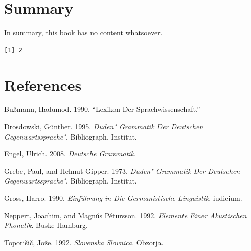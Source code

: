 \documentclass[
  letterpaper,
]{scrbook}
\newlength{\cslhangindent}
\newlength{\cslentryspacingunit} %
\newenvironment{CSLReferences}[2] %
 {%
  \setlength{\parindent}{0pt}
  \ifodd #1
  \let\oldpar\par
  \def\par{\hangindent=\cslhangindent\oldpar}
  \fi
  \setlength{\parskip}{#2\cslentryspacingunit}
 }%
 {}
\begin{document}

\hypertarget{summary}{%
\chapter{Summary}\label{summary}}

In summary, this book has no content whatsoever.

\begin{verbatim}
[1] 2
\end{verbatim}


\hypertarget{references}{%
\chapter*{References}\label{references}}


\hypertarget{refs}{}
\begin{CSLReferences}{1}{0}
\leavevmode{}%
Bußmann, Hadumod. 1990. {``Lexikon Der Sprachwissenschaft.''}

\leavevmode{}%
Drosdowski, Günther. 1995. \emph{Duden" Grammatik Der Deutschen
Gegenwartssprache"}. Bibliograph. Institut.

\leavevmode{}%
Engel, Ulrich. 2008. \emph{Deutsche Grammatik}.

\leavevmode{}%
Grebe, Paul, and Helmut Gipper. 1973. \emph{Duden" Grammatik Der
Deutschen Gegenwartssprache"}. Bibliograph. Institut.

\leavevmode{}%
Gross, Harro. 1990. \emph{Einf{ü}hrung in Die Germanistische
Linguistik}. iudicium.

\leavevmode{}%
Neppert, Joachim, and Magnús Pétursson. 1992. \emph{Elemente Einer
Akustischen Phonetik}. Buske Hamburg.

\leavevmode{}%
Toporišič, Jože. 1992. \emph{Slovenska Slovnica}. Obzorja.

\end{CSLReferences}


\backmatter

\printindex
\end{document}

